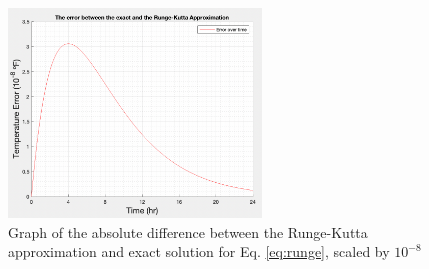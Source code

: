 \documentclass[titlepage]{article}
\begin{document}
\begin{figure}[H]
    \centering
    \includegraphics[width=0.6\textwidth]{./images/rungeKuttaError.png}
    \caption{Graph of the absolute difference between the Runge-Kutta approximation and exact solution for Eq. \eqref{eq:runge}, scaled by $10^{-8}$}
    \label{fig:rungeKuttaError}
\end{figure}



\end{document}
